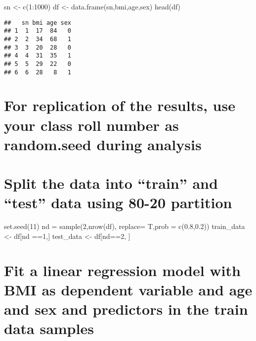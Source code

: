 \documentclass[
]{article}
\newenvironment{Shaded}{\begin{snugshade}}{\end{snugshade}}
\newcommand{\AttributeTok}[1]{\textcolor[rgb]{0.77,0.63,0.00}{#1}}
\newcommand{\DecValTok}[1]{\textcolor[rgb]{0.00,0.00,0.81}{#1}}
\newcommand{\FloatTok}[1]{\textcolor[rgb]{0.00,0.00,0.81}{#1}}
\newcommand{\FunctionTok}[1]{\textcolor[rgb]{0.00,0.00,0.00}{#1}}
\newcommand{\NormalTok}[1]{#1}
\newcommand{\OtherTok}[1]{\textcolor[rgb]{0.56,0.35,0.01}{#1}}
\newcommand{\SpecialCharTok}[1]{\textcolor[rgb]{0.00,0.00,0.00}{#1}}
\begin{document}
\begin{Shaded}
\begin{Highlighting}[]
\NormalTok{sn }\OtherTok{\textless{}{-}} \FunctionTok{c}\NormalTok{(}\DecValTok{1}\SpecialCharTok{:}\DecValTok{1000}\NormalTok{)}
\NormalTok{df }\OtherTok{\textless{}{-}} \FunctionTok{data.frame}\NormalTok{(sn,bmi,age,sex)}
\FunctionTok{head}\NormalTok{(df)}
\end{Highlighting}
\end{Shaded}

\begin{verbatim}
##   sn bmi age sex
## 1  1  17  84   0
## 2  2  34  68   1
## 3  3  20  28   0
## 4  4  31  35   1
## 5  5  29  22   0
## 6  6  28   8   1
\end{verbatim}

\hypertarget{for-replication-of-the-results-use-your-class-roll-number-as-random.seed-during-analysis}{%
\section{For replication of the results, use your class roll number as
random.seed during
analysis}\label{for-replication-of-the-results-use-your-class-roll-number-as-random.seed-during-analysis}}

\hypertarget{split-the-data-into-train-and-test-data-using-80-20-partition}{%
\section{Split the data into ``train'' and ``test'' data using 80-20
partition}\label{split-the-data-into-train-and-test-data-using-80-20-partition}}

\begin{Shaded}
\begin{Highlighting}[]
\FunctionTok{set.seed}\NormalTok{(}\DecValTok{11}\NormalTok{)}
\NormalTok{nd }\OtherTok{=} \FunctionTok{sample}\NormalTok{(}\DecValTok{2}\NormalTok{,}\FunctionTok{nrow}\NormalTok{(df), }\AttributeTok{replace=}\NormalTok{ T,}\AttributeTok{prob =} \FunctionTok{c}\NormalTok{(}\FloatTok{0.8}\NormalTok{,}\FloatTok{0.2}\NormalTok{))}
\NormalTok{train\_data }\OtherTok{\textless{}{-}}\NormalTok{ df[nd }\SpecialCharTok{==}\DecValTok{1}\NormalTok{,]}
\NormalTok{test\_data }\OtherTok{\textless{}{-}}\NormalTok{ df[nd}\SpecialCharTok{==}\DecValTok{2}\NormalTok{, ]}
\end{Highlighting}
\end{Shaded}

\hypertarget{fit-a-linear-regression-model-with-bmi-as-dependent-variable-and-age-and-sex-and-predictors-in-the-train-data-samples}{%
\section{Fit a linear regression model with BMI as dependent variable
and age and sex and predictors in the train data
samples}\label{fit-a-linear-regression-model-with-bmi-as-dependent-variable-and-age-and-sex-and-predictors-in-the-train-data-samples}}
\end{document}
